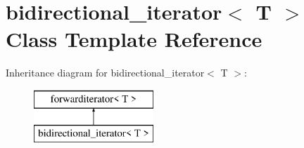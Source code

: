 \hypertarget{classbidirectional__iterator}{}\section{bidirectional\+\_\+iterator$<$ T $>$ Class Template Reference}
\label{classbidirectional__iterator}
Inheritance diagram for bidirectional\+\_\+iterator$<$ T $>$\+:\begin{figure}[H]
\begin{center}
\leavevmode
\includegraphics[height=2.000000cm]{classbidirectional__iterator}
\end{center}
\end{figure}

